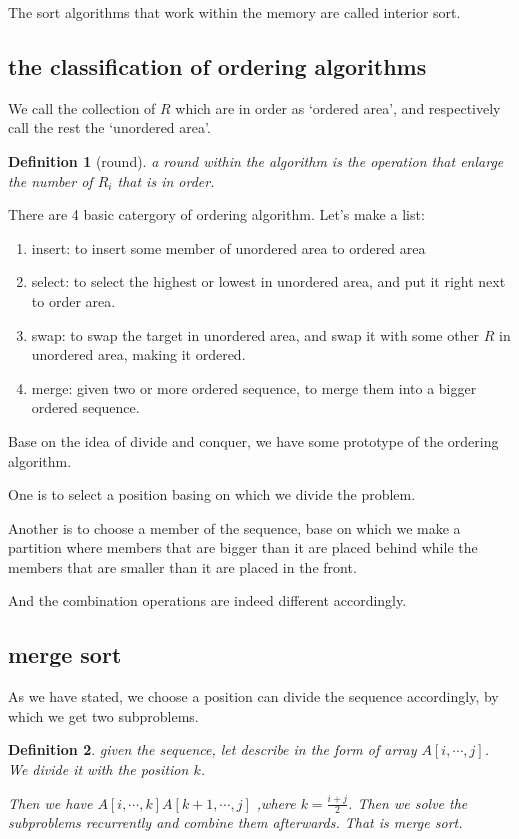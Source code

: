 \documentclass[a4paper, 10pt]{ctexart} %
\newtheorem{definition}{Definition}
\begin{document}
The sort algorithms that work within the memory are called interior sort.

\subsection{the classification of ordering algorithms}
We call the collection of $R$ which are in order as `ordered area', and respectively call the rest the `unordered area'. 

\begin{definition}[round] 
    a round within the algorithm is the operation that enlarge the number of $R_{i}$ that is in order.
\end{definition}

There are 4 basic catergory of ordering algorithm. Let's make a list: 
\begin{enumerate}
    \item insert: to insert some member of unordered area to ordered area
    \item select: to select the highest or lowest in unordered area, and put it right next to order area.
    \item swap: to swap the target in unordered area, and swap it with some other $R$ in unordered area, making it ordered.
    \item merge: given two or more ordered sequence, to merge them into a bigger ordered sequence.
\end{enumerate}

Base on the idea of divide and conquer, we have some prototype of the ordering algorithm. 

One is to select a position basing on which we divide the problem.

Another is to choose a member of the sequence, base on which we make a partition where
members that are bigger than it are placed behind while the members that are smaller than it 
are placed in the front.

And the combination operations are indeed different accordingly. 

\subsection{merge sort}
As we have stated, we choose a position can divide the sequence accordingly, by which we get two 
subproblems. 
\begin{definition}
    given the sequence, let describe in the form of array
    $A[i,\cdots, j]$. We divide it with the position $k$. 

    Then we have $A[ i, \cdots    , k  ] A \left[  k + 1 ,  \cdots  , j\right]$ ,where $k  = \displaystyle  \frac{ i  +j}{ 2}$. Then we solve  the subproblems
    recurrently and combine them afterwards. That is merge sort.
\end{definition}
\end{document}
